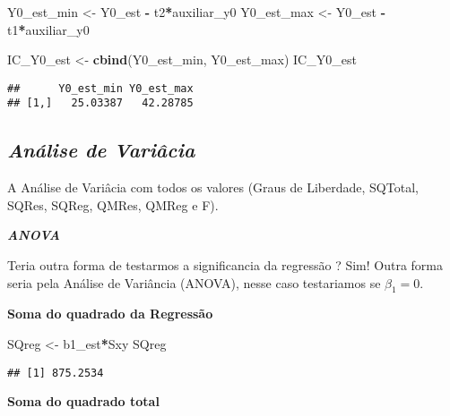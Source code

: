 \documentclass[
]{article}
\newenvironment{Shaded}{\begin{snugshade}}{\end{snugshade}}
\newcommand{\KeywordTok}[1]{\textcolor[rgb]{0.13,0.29,0.53}{\textbf{#1}}}
\newcommand{\NormalTok}[1]{#1}
\newcommand{\OperatorTok}[1]{\textcolor[rgb]{0.81,0.36,0.00}{\textbf{#1}}}
\newcommand{\StringTok}[1]{\textcolor[rgb]{0.31,0.60,0.02}{#1}}
\begin{document}
\begin{Shaded}
\begin{Highlighting}[]
\NormalTok{Y0_est_min <-}\StringTok{ }\NormalTok{Y0_est }\OperatorTok{-}\StringTok{ }\NormalTok{t2}\OperatorTok{*}\NormalTok{auxiliar_y0}
\NormalTok{Y0_est_max <-}\StringTok{ }\NormalTok{Y0_est }\OperatorTok{-}\StringTok{ }\NormalTok{t1}\OperatorTok{*}\NormalTok{auxiliar_y0}
\end{Highlighting}
\end{Shaded}

\begin{Shaded}
\begin{Highlighting}[]
\NormalTok{IC_Y0_est <-}\StringTok{ }\KeywordTok{cbind}\NormalTok{(Y0_est_min, Y0_est_max)}
\NormalTok{IC_Y0_est}
\end{Highlighting}
\end{Shaded}

\begin{verbatim}
##      Y0_est_min Y0_est_max
## [1,]   25.03387   42.28785
\end{verbatim}

\hypertarget{anuxe1lise-de-variuxe2cia}{%
\subsection{\texorpdfstring{\textbf{\emph{Análise de
Variâcia}}}{Análise de Variâcia}}\label{anuxe1lise-de-variuxe2cia}}

A Análise de Variâcia com todos os valores (Graus de Liberdade, SQTotal,
SQRes, SQReg, QMRes, QMReg e F).

\textbf{\emph{ANOVA}}

Teria outra forma de testarmos a significancia da regressão ? Sim! Outra
forma seria pela Análise de Variância (ANOVA), nesse caso testariamos se
\(\beta_1 = 0\).

\textbf{Soma do quadrado da Regressão}

\begin{Shaded}
\begin{Highlighting}[]
\NormalTok{SQreg <-}\StringTok{ }\NormalTok{b1_est}\OperatorTok{*}\NormalTok{Sxy}
\NormalTok{SQreg}
\end{Highlighting}
\end{Shaded}

\begin{verbatim}
## [1] 875.2534
\end{verbatim}

\textbf{Soma do quadrado total}
\end{document}
